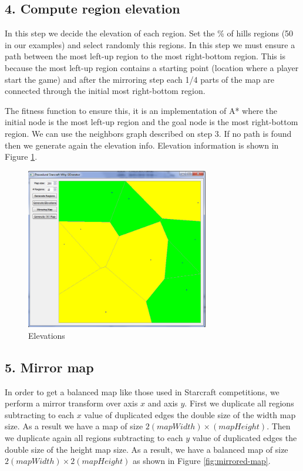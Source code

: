 \documentclass[letterpaper]{article}
\begin{document}
\subsection{4. Compute region elevation}
In this step we decide the elevation of each region. Set the \% of hills regions (50 in our examples) and select randomly this regions. In this step we must ensure a path between the most left-up region to the most right-bottom region. This is because the most left-up region contains a starting point (location where a player start the game) and after the mirroring step each 1/4 parts of the map are connected through the initial most right-bottom region.

The fitness function to ensure this, it is an implementation of A* where the initial node is the most left-up region and the goal node is the most right-bottom region. We can use the neighbors graph described on step 3. If no path is found then we generate again the elevation info. Elevation information is shown in Figure \ref{fig:elevations}.

\begin{figure}[ht]
    \centering
    \includegraphics[width=8cm]{PCG03.png}
    \caption{Elevations}
    \label{fig:elevations}
\end{figure}

\subsection{5. Mirror map}
In order to get a balanced map like those used in Starcraft competitions, we perform a mirror transform over axis $x$ and axis $y$. First we duplicate all regions subtracting to each $x$ value of duplicated edges the double size of the width map size. As a result we have a map of size $2(mapWidth) \times (mapHeight)$. Then we duplicate again all regions subtracting to each $y$ value of duplicated edges the double size of the height map size. As a result, we have a balanced map of size $2(mapWidth)  \times 2(mapHeight)$ as shown in Figure \ref{fig:mirrored-map}.
\end{document}
